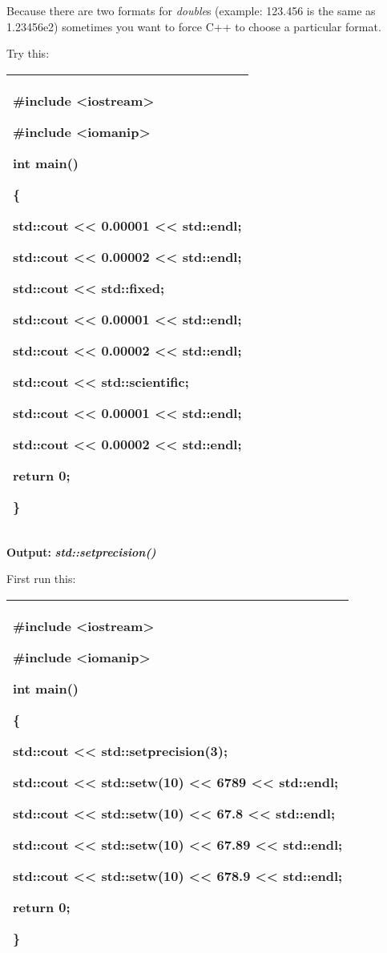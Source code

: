 \documentclass[
]{article}
\begin{document}
Because there are two formats for \emph{double}s (example: 123.456 is
the same as 1.23456e2) sometimes you want to force C++ to choose a
particular format.

Try this:

\begin{longtable}[]{@{}l@{}}
\toprule
\endhead
\begin{minipage}[t]{0.97\columnwidth}\raggedright
\#include \textless iostream\textgreater{}

\#include \textless iomanip\textgreater{}

int main()

\{

std::cout \textless\textless{} 0.00001 \textless\textless{} std::endl;

std::cout \textless\textless{} 0.00002 \textless\textless{} std::endl;

std::cout \textless\textless{} std::fixed;

std::cout \textless\textless{} 0.00001 \textless\textless{} std::endl;

std::cout \textless\textless{} 0.00002 \textless\textless{} std::endl;

std::cout \textless\textless{} std::scientific;

std::cout \textless\textless{} 0.00001 \textless\textless{} std::endl;

std::cout \textless\textless{} 0.00002 \textless\textless{} std::endl;

return 0;

\}\strut
\end{minipage}\tabularnewline
\bottomrule
\end{longtable}

\textbf{Output: }\emph{\textbf{std::setprecision()}}

First run this:

\begin{longtable}[]{@{}l@{}}
\toprule
\endhead
\begin{minipage}[t]{0.97\columnwidth}\raggedright
\#include \textless iostream\textgreater{}

\#include \textless iomanip\textgreater{}

int main()

\{

std::cout \textless\textless{} std::setprecision(3);

std::cout \textless\textless{} std::setw(10) \textless\textless{} 6789
\textless\textless{} std::endl;

std::cout \textless\textless{} std::setw(10) \textless\textless{} 67.8
\textless\textless{} std::endl;

std::cout \textless\textless{} std::setw(10) \textless\textless{} 67.89
\textless\textless{} std::endl;

std::cout \textless\textless{} std::setw(10) \textless\textless{} 678.9
\textless\textless{} std::endl;

return 0;

\}\strut
\end{minipage}\tabularnewline
\bottomrule
\end{longtable}
\end{document}
